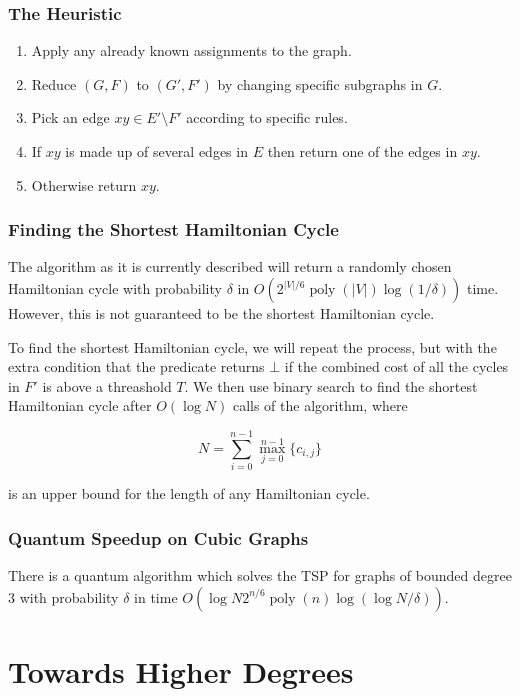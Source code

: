 \documentclass[]{beamer}
\DeclareMathOperator{\poly}{poly}
\begin{document}
\begin{frame}
\frametitle{The Heuristic}

\begin{enumerate}
\item Apply any already known assignments to the graph.
\item Reduce $(G, F)$ to $(G', F')$ by changing specific subgraphs in $G$.
\item Pick an edge $xy \in E' \setminus F'$ according to specific rules.
\item If $xy$ is made up of several edges in $E$ then return one of the edges in $xy$.
\item Otherwise return $xy$.
\end{enumerate}
\end{frame}

\begin{frame}
\frametitle{Finding the Shortest Hamiltonian Cycle}

The algorithm as it is currently described will return a randomly chosen Hamiltonian cycle with probability $\delta$ in $O(2^{|V|/6}\poly(|V|)\log(1/\delta))$ time. However, this is not guaranteed to be the shortest Hamiltonian cycle.

To find the shortest Hamiltonian cycle, we will repeat the process, but with the extra condition that the predicate returns $\bot$ if the combined cost of all the cycles in $F'$ is above a threashold $T$. We then use binary search to find the shortest Hamiltonian cycle after $O(\log N)$ calls of the algorithm, where

$$N = \sum_{i = 0}^{n-1}\max_{j = 0}^{n-1}\{c_{i,j}\}$$

is an upper bound for the length of any Hamiltonian cycle.
\end{frame}

\begin{frame}
\frametitle{Quantum Speedup on Cubic Graphs}
\begin{theorem}
There is a quantum algorithm which solves the TSP for graphs of bounded degree $3$ with probability $\delta$ in time $O(\log N2^{n/6}\poly(n)\log(\log N/\delta))$.
\end{theorem}
\end{frame}

\section{Towards Higher Degrees}
\end{document}
